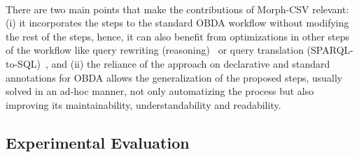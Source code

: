 \paragraph{}
There are two main points that make the contributions of Morph-CSV relevant: (i) it incorporates the steps to the standard OBDA workflow without modifying the rest of the steps, hence, it can also benefit from optimizations in other steps of the workflow like query rewriting (reasoning)~\citep{mora2014kyrie2} or query translation (SPARQL-to-SQL)~\citep{priyatna2014formalisation}, and (ii) the reliance of the approach on declarative and standard annotations for OBDA allows the generalization of the proposed steps, usually solved in an ad-hoc manner, not only automatizing the process but also improving its maintainability, understandability and readability.




\subsection{Experimental Evaluation}

